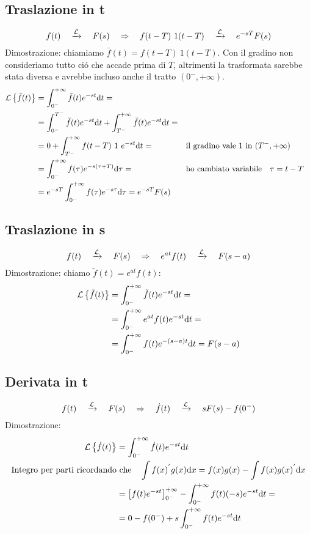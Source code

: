 \documentclass[../main.tex]{subfiles}
\begin{document}
	\subsection{Traslazione in t}
	\label{trasl_t}
	$$ f(t) \quad \xrightarrow{\mathcal{L}} \quad F(s) \quad \Rightarrow \quad f(t-T)\ 1(t-T) \quad \xrightarrow{\mathcal{L}} \quad e^{-sT}F(s) $$
	\linebreak
	Dimostrazione: chiamiamo $ \bar{f}(t) = f(t-T)\ 1(t-T) $. Con il gradino non consideriamo tutto ci\'{o} che accade prima di $T$, altrimenti la trasformata sarebbe stata diversa e avrebbe incluso anche il tratto $(0^{-},+ \infty)$.
	\begin{align*}
		\mathcal{L} \left\lbrace \bar{f}(t) \right\rbrace &= \int_{0^{-}}^{+\infty} \bar{f}(t) e^{- s t} \mathrm{d} t =\\
		&= \int_{0^{-}}^{T^{-}} \bar{f}(t) e^{-st} \mathrm{d}t + \int_{T^{-}}^{+ \infty} \bar{f}(t) e^{-st} \mathrm{d}t =\\
		&= 0+ \int_{T^{-}}^{+ \infty} f(t-T)\ 1\ e^{-st} \mathrm{d}t=
		\qquad &&\text{il gradino vale 1 in } (T^{-},+ \infty) \\
		&= \int_{0^{-}}^{+ \infty} f(\tau) e^{-s(\tau+T)} \mathrm{d}\tau = \qquad &&\text{ho cambiato variabile} \quad \tau=t-T\\
		&= e^{-sT} \int_{0^{-}}^{+\infty} f(\tau) e^{- s \tau} \mathrm{d} \tau = e^{-sT} F(s)
	\end{align*}
	\subsection{Traslazione in s}
	\label{trasl_s}
	$$ f(t) \quad \xrightarrow{\mathcal{L}} \quad F(s) \quad \Rightarrow \quad e^{at}f(t) \quad \xrightarrow{\mathcal{L}} \quad F(s-a)$$
	Dimostrazione: chiamo $\tilde{f}(t) = e^{at} f(t) $:\\
	\begin{align*}
		\mathcal{L} \left\lbrace \tilde{f}(t) \right\rbrace &= \int_{0^{-}}^{+\infty} \tilde{f}(t) e^{- s t} \mathrm{d} t =\\
		&= \int_{0^{-}}^{+\infty} e^{at}f(t) e^{- s t} \mathrm{d} t = \\
		&= \int_{0^{-}}^{+ \infty} f(t) e^{-(s-a)t} \mathrm{d}t = F(s-a)
	\end{align*}
	\subsection{Derivata in t}
	\label{deriv_t}
	$$ f(t) \quad \xrightarrow{\mathcal{L}} \quad F(s) \quad \Rightarrow \quad \dot{f}(t) \quad \xrightarrow{\mathcal{L}} \quad sF(s)-f(0^{-}) $$
	Dimostrazione:
	\begin{align*}
		\mathcal{L} \left\lbrace \dot{f}(t) \right\rbrace &= \int_{0^{-}}^{+\infty} \dot{f}(t) e^{- s t} \mathrm{d} t\\
		\text{Integro per parti ricordando} &\text{ che} \quad \int f(x)^{'}g(x)\mathrm{d}x = f(x)g(x) - \int f(x)g(x)^{'} \mathrm{d}x\\
		&= \left[ f(t)e^{-st} \right]_{0^{-}}^{+\infty} - \int_{0^{-}}^{+\infty} f(t)(-s) e^{- s t} \mathrm{d} t =\\
		&= 0 - f(0^{-}) + s \int_{0^{-}}^{+\infty} f(t) e^{- s t} \mathrm{d} t 
	\end{align*}
\end{document}
